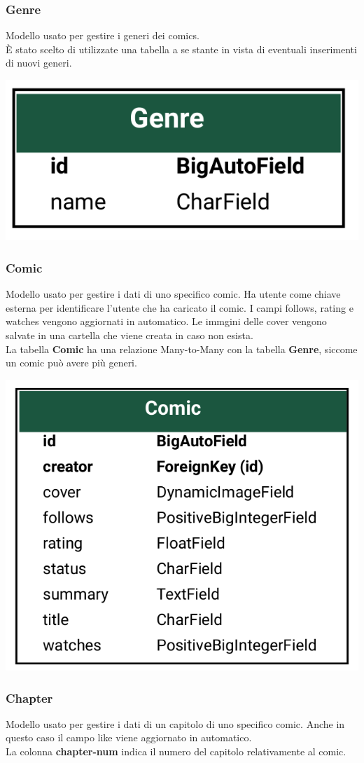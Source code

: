 \subsubsection{Genre}
Modello usato per gestire i generi dei comics.
\\È stato scelto di utilizzate una tabella a se stante in vista di eventuali inserimenti di nuovi generi.

\begin{center}
  \includegraphics[width=0.4\linewidth]{images/genre.png}
\end{center}


\subsubsection{Comic}
Modello usato per gestire i dati di uno specifico comic.
Ha utente come chiave esterna per identificare l’utente che ha caricato il comic.
I campi follows, rating e watches vengono aggiornati in automatico.
Le immgini delle cover vengono salvate in una cartella che viene creata in
caso non esista.
\\La tabella \textbf{Comic} ha una relazione Many-to-Many con la tabella \textbf{Genre}, siccome un comic può avere più generi.

\begin{center}
  \includegraphics[width=0.4\linewidth]{images/comic.png}
\end{center}

\subsubsection{Chapter}
Modello usato per gestire i dati di un capitolo di uno specifico comic.
Anche in questo caso il campo like viene aggiornato in automatico.
\\La colonna \textbf{chapter-num} indica il numero del capitolo relativamente al comic.



